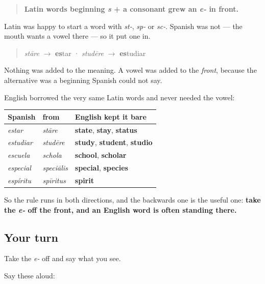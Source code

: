 \begin{grammarlens}[title={Grammar Lens: a word cannot start like that}]
\begin{quote}
\textbf{Latin words beginning \emph{s} + a consonant grew an \emph{e-} in front.}
\end{quote}

Latin was happy to start a word with \emph{st-}, \emph{sp-} or \emph{sc-}. Spanish was not — the mouth wants a vowel there — so it put one in.

\begin{quote}
\emph{stāre} $\to$ \textbf{es}tar  ·  \emph{studēre} $\to$ \textbf{es}tudiar
\end{quote}

Nothing was added to the meaning. A vowel was added to the \emph{front}, because the alternative was a beginning Spanish could not say.

English borrowed the very same Latin words and never needed the vowel:

\noindent
\begin{tabularx}{\linewidth}{@{}>{\raggedright\arraybackslash}X>{\raggedright\arraybackslash}X>{\raggedright\arraybackslash}X@{}}
\toprule
\textbf{Spanish} & \textbf{from} & \textbf{English kept it bare} \\
\midrule
\emph{estar} & \emph{stāre} & \textbf{state}, \textbf{stay}, \textbf{status} \\
\emph{estudiar} & \emph{studēre} & \textbf{study}, \textbf{student}, \textbf{studio} \\
\emph{escuela} & \emph{schola} & \textbf{school}, \textbf{scholar} \\
\emph{especial} & \emph{speciālis} & \textbf{special}, \textbf{species} \\
\emph{espíritu} & \emph{spīritus} & \textbf{spirit} \\
\bottomrule
\end{tabularx}

So the rule runs in both directions, and the backwards one is the useful one: \textbf{take the \emph{e-} off the front, and an English word is often standing there.}
\end{grammarlens}

\subsection*{Your turn}
Take the \emph{e-} off and say what you see.

Say these aloud:

